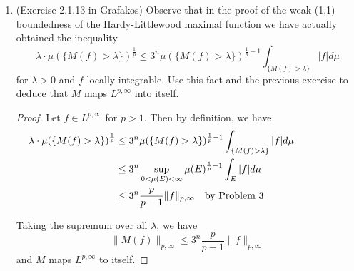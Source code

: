 \documentclass[a4paper]{article}
\begin{document}
\begin{enumerate}
\begin{proof}
\begin{enumerate}
          Therefore, $| \| \cdot \| |_{p,\infty}$ is a norm on $L^{p,\infty}$ and $L^{p,\infty}$ is normable.
      \end{enumerate}

    \end{proof}

  \item (Exercise 2.1.13 in Grafakos) Observe that in the proof of the weak-(1,1) boundedness of the Hardy-Littlewood maximal function we have
    actually obtained the inequality
    \[ \lambda \cdot \mu( \{ M(f) > \lambda \} )^{\frac{1}{p}} \leq 3^n \mu( \{M(f) > \lambda \})^{\frac{1}{p} - 1} \int_{\{M(f)>\lambda\}}^{} |f|
    d\mu \]
    for $\lambda > 0$ and $f$ locally integrable. Use this fact and the previous exercise to deduce that $M$ maps $L^{p,\infty}$ into itself.

    \begin{proof}

      Let $f \in L^{p,\infty}$ for $p>1$. Then by definition, we have
      \begin{align*}
        \lambda \cdot \mu( \{M(f) > \lambda \})^{\frac{1}{p}} &\leq 3^n \mu( \{ M(f) > \lambda \} )^{\frac{1}{p}-1} \int_{\{ M(f) > \lambda \}}^{} |f|
        d\mu \\
        &\leq 3^n \sup_{0 < \mu(E) < \infty} \mu(E)^{\frac{1}{p}-1} \int_{E}^{} |f| d\mu \\
        &\leq 3^n \frac{p}{p-1} \|f\|_{p,\infty} \quad \parbox{5cm}{by Problem 3}
      \end{align*}

      Taking the supremum over all $\lambda$, we have
      \[ \| M(f) \|_{p,\infty} \leq 3^n \frac{p}{p-1} \|f\|_{p,\infty} \]
      and $M$ maps $L^{p,\infty}$ to itself.

    \end{proof}
\end{enumerate}
\end{document}

